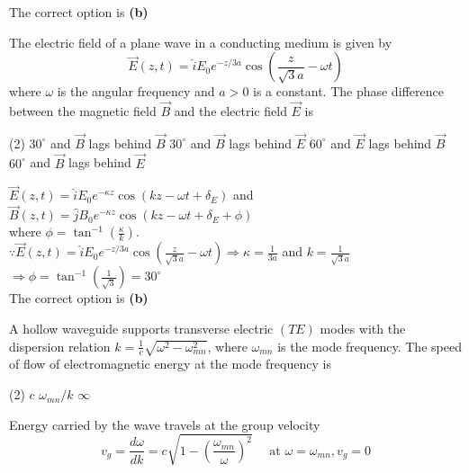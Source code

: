 \begin{enumerate}
\begin{answer}
	The correct option is \textbf{(b)}
\end{answer}
\begin{minipage}{\textwidth}
	\item The electric field of a plane wave in a conducting medium is given by
	$$
	\vec{E}(z, t)=\hat{i} E_{0} e^{-z / 3 a} \cos \left(\frac{z}{\sqrt{3} a}-\omega t\right)
	$$
	where $\omega$ is the angular frequency and $a>0$ is a constant. The phase difference between the magnetic field $\vec{B}$ and the electric field $\vec{E}$ is
\end{minipage}
\begin{tasks}(2)
	\task[\textbf{A.}] $30^{\circ}$ and $\vec{B}$ lags behind $\vec{B}$
	\task[\textbf{B.}]$30^{\circ}$ and $\vec{B}$ lags behind $\vec{E}$
	\task[\textbf{C.}]$60^{\circ}$ and $\vec{E}$ lags behind $\vec{B}$
	\task[\textbf{D.}]$60^{\circ}$ and $\vec{B}$ lags behind $\vec{E}$
\end{tasks}
\begin{answer}
	$\vec{E}(z, t)=\hat{i} E_{0} e^{-\kappa z} \cos \left(k z-\omega t+\delta_{E}\right)$ and $\vec{B}(z, t)=\hat{j} B_{0} e^{-\kappa z} \cos \left(k z-\omega t+\delta_{E}+\phi\right)$\\
	where $\phi=\tan ^{-1}\left(\frac{\kappa}{k}\right)$.\\
	$\because \vec{E}(z, t)=\hat{i} E_{0} e^{-z / 3 a} \cos \left(\frac{z}{\sqrt{3} a}-\omega t\right) \Rightarrow \kappa=\frac{1}{3 a}$ and $k=\frac{1}{\sqrt{3} a}$\\
	$\Rightarrow \phi=\tan ^{-1}\left(\frac{1}{\sqrt{3}}\right)=30^{\circ}$	\\
	The correct option is \textbf{(b)}
\end{answer}
\begin{minipage}{\textwidth}
	\item A hollow waveguide supports transverse electric $(T E)$ modes with the dispersion relation $k=\frac{1}{c} \sqrt{\omega^{2}-\omega_{m n}^{2}}$, where $\omega_{m n}$ is the mode frequency. The speed of flow of electromagnetic energy at the mode frequency is
\end{minipage}
\begin{tasks}(2)
	\task[\textbf{A.}] $c$
	\task[\textbf{B.}] $\omega_{m n} / k$
	\task[\textbf{D.}] $\infty$
\end{tasks}
\begin{answer}
	Energy carried by the wave travels at the group velocity
	$$
	v_{g}=\frac{d \omega}{d k}=c \sqrt{1-\left(\frac{\omega_{m n}}{\omega}\right)^{2}} \quad \text { at } \omega=\omega_{m n}, v_{g}=0
$$
\end{answer}
\end{enumerate}
